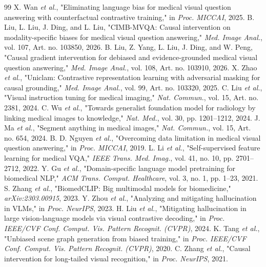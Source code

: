 \documentclass[journal,twoside,web]{ieeecolor}
\begin{document}
\begin{thebibliography}{99}
 X. Wan \textit{et al.}, "Eliminating language bias for medical visual question answering with counterfactual contrastive training," in \textit{Proc. MICCAI}, 2025.
 B. Liu, L. Liu, J. Ding, and L. Liu, "CIMB-MVQA: Causal intervention on modality-specific biases for medical visual question answering," \textit{Med. Image Anal.}, vol. 107, Art. no. 103850, 2026.
 B. Liu, Z. Yang, L. Liu, J. Ding, and W. Peng, "Causal gradient intervention for debiased and evidence-grounded medical visual question answering," \textit{Med. Image Anal.}, vol. 108, Art. no. 103910, 2026.
 X. Zhao \textit{et al.}, "Uniclam: Contrastive representation learning with adversarial masking for causal grounding," \textit{Med. Image Anal.}, vol. 99, Art. no. 103320, 2025.
 C. Liu \textit{et al.}, "Visual instruction tuning for medical imaging," \textit{Nat. Commun.}, vol. 15, Art. no. 2381, 2024.
 C. Wu \textit{et al.}, "Towards generalist foundation model for radiology by linking medical images to knowledge," \textit{Nat. Med.}, vol. 30, pp. 1201--1212, 2024.
 J. Ma \textit{et al.}, "Segment anything in medical images," \textit{Nat. Commun.}, vol. 15, Art. no. 654, 2024.
 B. D. Nguyen \textit{et al.}, "Overcoming data limitation in medical visual question answering," in \textit{Proc. MICCAI}, 2019.
 L. Li \textit{et al.}, "Self-supervised feature learning for medical VQA," \textit{IEEE Trans. Med. Imag.}, vol. 41, no. 10, pp. 2701--2712, 2022.
 Y. Gu \textit{et al.}, "Domain-specific language model pretraining for biomedical NLP," \textit{ACM Trans. Comput. Healthcare}, vol. 3, no. 1, pp. 1--23, 2021.
 S. Zhang \textit{et al.}, "BiomedCLIP: Big multimodal models for biomedicine," \textit{arXiv:2303.00915}, 2023.
 Y. Zhou \textit{et al.}, "Analyzing and mitigating hallucination in VLMs," in \textit{Proc. NeurIPS}, 2023.
 H. Liu \textit{et al.}, "Mitigating hallucination in large vision-language models via visual contrastive decoding," in \textit{Proc. IEEE/CVF Conf. Comput. Vis. Pattern Recognit. (CVPR)}, 2024.
 K. Tang \textit{et al.}, "Unbiased scene graph generation from biased training," in \textit{Proc. IEEE/CVF Conf. Comput. Vis. Pattern Recognit. (CVPR)}, 2020.
 C. Zhang \textit{et al.}, "Causal intervention for long-tailed visual recognition," in \textit{Proc. NeurIPS}, 2021.

\end{thebibliography}
\end{document}
